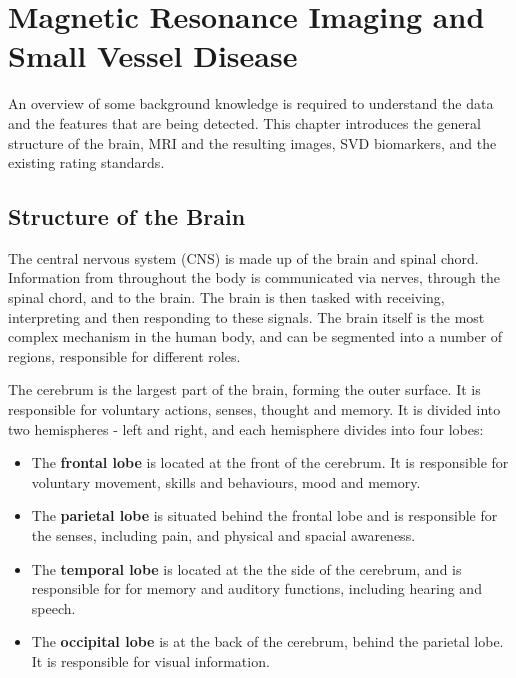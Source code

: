 \documentclass[honours,12pt]{unswthesis}
\numberwithin{equation}{section}
\begin{document}
\chapter{Magnetic Resonance Imaging and Small Vessel Disease}\label{mri_svd_intro}

An overview of some background knowledge is required to understand the data and the features that are being detected. This chapter introduces the general structure of the brain, MRI and the resulting images, SVD biomarkers, and the existing rating standards.

\section{Structure of the Brain}\label{svd-brain}

The central nervous system (CNS) is made up of the brain and spinal chord. Information from throughout the body is communicated via nerves, through the spinal chord, and to the brain. The brain is then tasked with receiving, interpreting and then responding to these signals. The brain itself is the most complex mechanism in the human body, and can be segmented into a number of regions, responsible for different roles. 

The cerebrum is the largest part of the brain, forming the outer surface. It is responsible for voluntary actions, senses, thought and memory. It is divided into two hemispheres - left and right, and each hemisphere divides into four lobes: \begin{itemize}
	\item The \textbf{frontal lobe} is located at the front of the cerebrum. It is responsible for voluntary movement, skills and behaviours, mood and memory.
	\item The \textbf{parietal lobe} is situated behind the frontal lobe and is responsible for the senses, including pain, and physical and spacial awareness.
	\item The \textbf{temporal lobe} is located at the the side of the cerebrum, and is responsible for for memory and auditory functions, including hearing and speech.
	\item The \textbf{occipital lobe} is at the back of the cerebrum, behind the parietal lobe. It is responsible for visual information.
\end{itemize}
\end{document}
